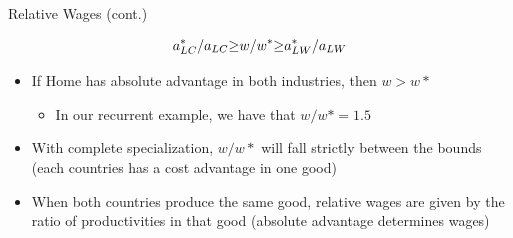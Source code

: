\documentclass[10pt,hyperref={CJKbookmarks=true},xcolor=dvipsnames,aspectratio=169]{beamer}
\begin{document}
\begin{frame}{Relative Wages (cont.) }


\[
a_{LC}^{*}/a_{LC}\text{\ensuremath{\ge}}w/w^{*}\text{\ensuremath{\ge}}a_{LW}^{*}/a_{LW}
\]

\begin{itemize}
\item If Home has absolute advantage in both industries, then $w>w*$ 

\begin{itemize}
\item In our recurrent example, we have that $w/w*=1.5$
\end{itemize}
\item With complete specialization, $w/w*$ will fall strictly between the
bounds (each countries has a cost advantage in one good) 
\item When both countries produce the same good, relative wages are given
by the ratio of productivities in that good (absolute advantage determines
wages) 
\end{itemize}
\end{frame}
\end{document}
